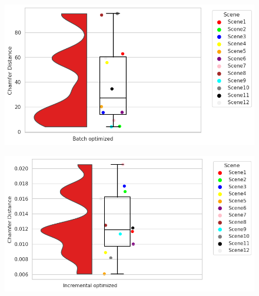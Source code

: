 \documentclass[report.tex]{subfiles}
\begin{document}
\begin{itemize}
\begin{figure}[H]
\centering
\begin{minipage}{.45\textwidth}
  \centering
  \includegraphics[scale=0.45]{Images/Chamfer_Distance_batch.png}
  \label{fig:Chamfer_Distance_batch.png}
\end{minipage}%
\begin{minipage}{.45\textwidth}
  \centering
  \includegraphics[scale=0.45]{Images/Chamfer_Distance_incre.png}
  \label{fig:Chamfer_Distance_incre.png}
\end{minipage}
\end{figure}



\end{itemize}
\end{document}
